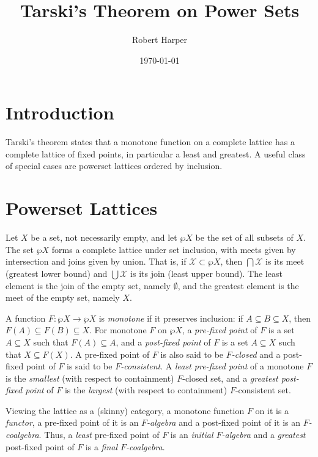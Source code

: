 \documentclass[11pt,twoside]{article}
\begin{document}
\title{Tarski's Theorem on Power Sets}
\author{Robert Harper}
\date{\today}

\maketitle{}

\section{Introduction}

Tarski's theorem states that a monotone function on a complete lattice has a complete
lattice of fixed points, in particular a least and greatest. A useful class of special
cases are powerset lattices ordered by inclusion.

\section{Powerset Lattices}

Let $X$ be a set, not necessarily empty, and let $\wp{X}$ be the set of all subsets of
$X$. The set $\wp{X}$ forms a complete lattice under set inclusion, with meets given by
intersection and joins given by union. That is, if $\mathcal{X}\subset\wp{X}$, then
$\bigcap{\mathcal{X}}$ is its meet (greatest lower bound) and $\bigcup{\mathcal{X}}$ is
its join (least upper bound). The least element is the join of the empty set, namely
$\emptyset$, and the greatest element is the meet of the empty set, namely $X$.

A function $F:\wp{X}\to\wp{X}$ is \emph{monotone} if it preserves inclusion: if
$A\subseteq B\subseteq X$, then $F(A)\subseteq F(B)\subseteq X$. For monotone $F$ on
$\wp{X}$, a \emph{pre-fixed point} of $F$ is a set $A\subseteq X$ such that $F(A)\subseteq
A$, and a \emph{post-fixed point} of $F$ is a set $A\subseteq X$ such that $X\subseteq
F(X)$. A pre-fixed point of $F$ is also said to be \emph{$F$-closed} and a post-fixed
point of $F$ is said to be \emph{$F$-consistent}. A \emph{least pre-fixed point} of a
monotone $F$ is the \emph{smallest} (with respect to containment) $F$-closed set, and a
\emph{greatest post-fixed point} of $F$ is the \emph{largest} (with respect to
containment) $F$-consistent set.

Viewing the lattice as a (skinny) category, a monotone function $F$ on it is a
\emph{functor}, a pre-fixed point of it is an \emph{$F$-algebra} and a post-fixed point of
it is an \emph{$F$-coalgebra}. Thus, a \emph{least} pre-fixed point of $F$ is an
\emph{initial $F$-algebra} and a \emph{greatest} post-fixed point of $F$ is a \emph{final
$F$-coalgebra}.
\end{document}
